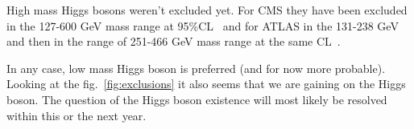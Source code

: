High mass Higgs bosons weren't excluded yet. For CMS they have been excluded in the 127-600 GeV mass range at 95\%CL~\cite{cms:prelim} and
for ATLAS in the 131-238 GeV and then in the range of 251-466 GeV mass range at the same CL~\cite{atlas:prelim}.

In any case, low mass Higgs boson is preferred (and for now more probable). Looking at the fig.~\ref{fig:exclusions} it also seems that we are gaining
on the Higgs boson. The question of the Higgs boson existence will most likely be resolved within this or the next year.
